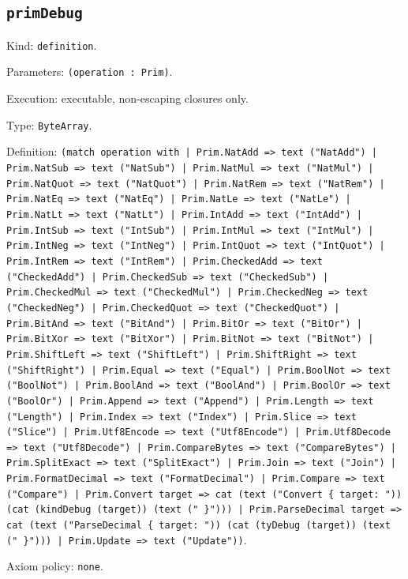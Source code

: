 \documentclass[11pt]{article}
\begin{document}
\subsection*{\texttt{primDebug}}
\noindent Kind: \texttt{definition}.\par
\noindent Parameters: \texttt{(operation : Prim)}.\par
\noindent Execution: executable, non-escaping closures only.\par
\noindent Type: \texttt{ByteArray}.\par
\noindent Definition: \texttt{(match operation with | Prim.NatAdd => text ("NatAdd") | Prim.NatSub => text ("NatSub") | Prim.NatMul => text ("NatMul") | Prim.NatQuot => text ("NatQuot") | Prim.NatRem => text ("NatRem") | Prim.NatEq => text ("NatEq") | Prim.NatLe => text ("NatLe") | Prim.NatLt => text ("NatLt") | Prim.IntAdd => text ("IntAdd") | Prim.IntSub => text ("IntSub") | Prim.IntMul => text ("IntMul") | Prim.IntNeg => text ("IntNeg") | Prim.IntQuot => text ("IntQuot") | Prim.IntRem => text ("IntRem") | Prim.CheckedAdd => text ("CheckedAdd") | Prim.CheckedSub => text ("CheckedSub") | Prim.CheckedMul => text ("CheckedMul") | Prim.CheckedNeg => text ("CheckedNeg") | Prim.CheckedQuot => text ("CheckedQuot") | Prim.BitAnd => text ("BitAnd") | Prim.BitOr => text ("BitOr") | Prim.BitXor => text ("BitXor") | Prim.BitNot => text ("BitNot") | Prim.ShiftLeft => text ("ShiftLeft") | Prim.ShiftRight => text ("ShiftRight") | Prim.Equal => text ("Equal") | Prim.BoolNot => text ("BoolNot") | Prim.BoolAnd => text ("BoolAnd") | Prim.BoolOr => text ("BoolOr") | Prim.Append => text ("Append") | Prim.Length => text ("Length") | Prim.Index => text ("Index") | Prim.Slice => text ("Slice") | Prim.Utf8Encode => text ("Utf8Encode") | Prim.Utf8Decode => text ("Utf8Decode") | Prim.CompareBytes => text ("CompareBytes") | Prim.SplitExact => text ("SplitExact") | Prim.Join => text ("Join") | Prim.FormatDecimal => text ("FormatDecimal") | Prim.Compare => text ("Compare") | Prim.Convert target => cat (text ("Convert \{ target: ")) (cat (kindDebug (target)) (text (" \}"))) | Prim.ParseDecimal target => cat (text ("ParseDecimal \{ target: ")) (cat (tyDebug (target)) (text (" \}"))) | Prim.Update => text ("Update"))}.\par
\noindent Axiom policy: \texttt{none}.\par
\end{document}
